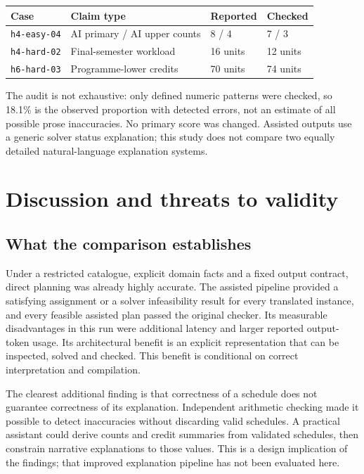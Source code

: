 \documentclass[11pt,a4paper]{article}
\newcommand{\code}[1]{\texttt{#1}}
\begin{document}
\begin{center}
\begin{minipage}{\linewidth}
\label{tab:explanations}
\begin{tabularx}{\linewidth}{@{}lYll@{}}
\toprule
Case & Claim type & Reported & Checked\\
\midrule
\code{h4-easy-04} & AI primary / AI upper counts & 8 / 4 & 7 / 3\\
\code{h4-hard-02} & Final-semester workload & 16 units & 12 units\\
\code{h6-hard-03} & Programme-lower credits & 70 units & 74 units\\
\bottomrule
\end{tabularx}
\end{minipage}
\end{center}

The audit is not exhaustive: only defined numeric patterns were checked, so
18.1\% is the observed proportion with detected errors, not an estimate of all
possible prose inaccuracies. No primary score was changed. Assisted outputs
use a generic solver status explanation; this study does not compare two
equally detailed natural-language explanation systems.

\par
\section{Discussion and threats to validity}
\subsection{What the comparison establishes}
Under a restricted catalogue, explicit domain facts and a fixed output
contract, direct planning was already highly accurate. The assisted pipeline
provided a satisfying assignment or a solver infeasibility result for every
translated instance, and every feasible assisted plan passed the original
checker. Its measurable disadvantages in this run were additional latency
and larger reported output-token usage. Its architectural benefit is an
explicit representation that can be inspected, solved and checked. This
benefit is conditional on correct interpretation and compilation.

The clearest additional finding is that correctness of a schedule does not
guarantee correctness of its explanation. Independent arithmetic checking
made it possible to detect inaccuracies without discarding valid schedules.
A practical assistant could derive counts and credit summaries from
validated schedules, then constrain narrative explanations to those values.
This is a design implication of the findings; that improved explanation
pipeline has not been evaluated here.
\end{document}
